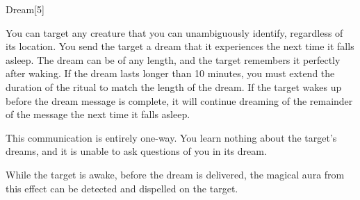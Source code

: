 \begin{spellsection}{Dream}[5]
    \begin{spellheader}
    \end{spellheader}
    \begin{spellcontent}
        \begin{spelltargetinginfo}
        \end{spelltargetinginfo}
        \begin{spelleffects}

            \spellspecial You can target any creature that you can unambiguously identify, regardless of its location.
            \spelleffect You send the target a dream that it experiences the next time it falls asleep. The dream can be of any length, and the target remembers it perfectly after waking. If the dream lasts longer than 10 minutes, you must extend the duration of the ritual to match the length of the dream. If the target wakes up before the dream message is complete, it will continue dreaming of the remainder of the message the next time it falls asleep.

        \end{spelleffects}
    \end{spellcontent}
    \begin{spellfooter}
        \spellnotes This communication is entirely one-way. You learn nothing about the target's dreams, and it is unable to ask questions of you in its dream.

        While the target is awake, before the dream is delivered, the magical aura from this effect can be detected and dispelled on the target.
    \end{spellfooter}
\end{spellsection}


